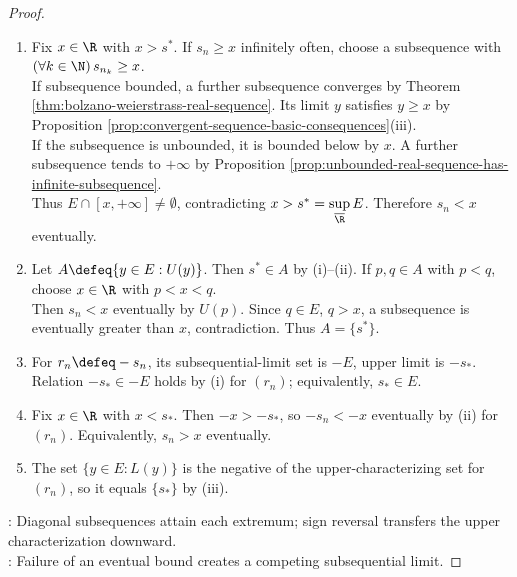 \begin{theorem}
\begin{proof}
\begin{enumerate}[label=(\roman*)]
\begin{enumerate}[label=(\alph*)]
Otherwise the recursive construction with $s_{n_k}\leq-k$ would place $-\infty$ in $E$.\\
If this tail is bounded above, it has a finite subsequential limit by Theorem \ref{thm:bolzano-weierstrass-real-sequence}.\\
If it is unbounded above, it has an infinite subsequential limit by Proposition \ref{prop:unbounded-real-sequence-has-infinite-subsequence}.\\
The infinite limit is $+\infty$ because the tail is bounded below.\\
Either case places an element greater than $-\infty$ in $E$, contradicting $s^*=\sup\limits_{\overline{\R}}E=-\infty$.
\end{enumerate}
\item Fix $x\in\R$ with $x>s^*$. If $s_n\geq x$ infinitely often, choose a subsequence with $(\forall k\in\N)\,s_{n_k}\geq x$.\\
If subsequence bounded, a further subsequence converges by Theorem \ref{thm:bolzano-weierstrass-real-sequence}. Its limit $y$ satisfies $y\geq x$ by Proposition \ref{prop:convergent-sequence-basic-consequences}(iii).\\
If the subsequence is unbounded, it is bounded below by $x$. A further subsequence tends to $+\infty$ by Proposition \ref{prop:unbounded-real-sequence-has-infinite-subsequence}.\\
Thus $E\cap[x,+\infty]\neq\emptyset$, contradicting $x>s^*=\sup\limits_{\overline{\R}}E$. Therefore $s_n<x$ eventually.
\item Let $A\defeq\{y\in E:U(y)\}$. Then $s^*\in A$ by (i)--(ii). If $p,q\in A$ with $p<q$, choose $x\in\R$ with $p<x<q$.\\
Then $s_n<x$ eventually by $U(p)$. Since $q\in E$, $q>x$, a subsequence is eventually greater than $x$, contradiction. Thus $A=\{s^*\}$.
\item For $r_n\defeq-s_n$, its subsequential-limit set is $-E$, upper limit is $-s_*$.\\
Relation $-s_*\in-E$ holds by (i) for $(r_n)$; equivalently, $s_*\in E$.
\item Fix $x\in\R$ with $x<s_*$. Then $-x>-s_*$, so $-s_n<-x$ eventually by (ii) for $(r_n)$. Equivalently, $s_n>x$ eventually.
\item The set $\{y\in E:L(y)\}$ is the negative of the upper-characterizing set for $(r_n)$, so it equals $\{s_*\}$ by (iii).
\end{enumerate}
: Diagonal subsequences attain each extremum; sign reversal transfers the upper characterization downward.\\
: Failure of an eventual bound creates a competing subsequential limit.
\end{proof}
\end{theorem}

